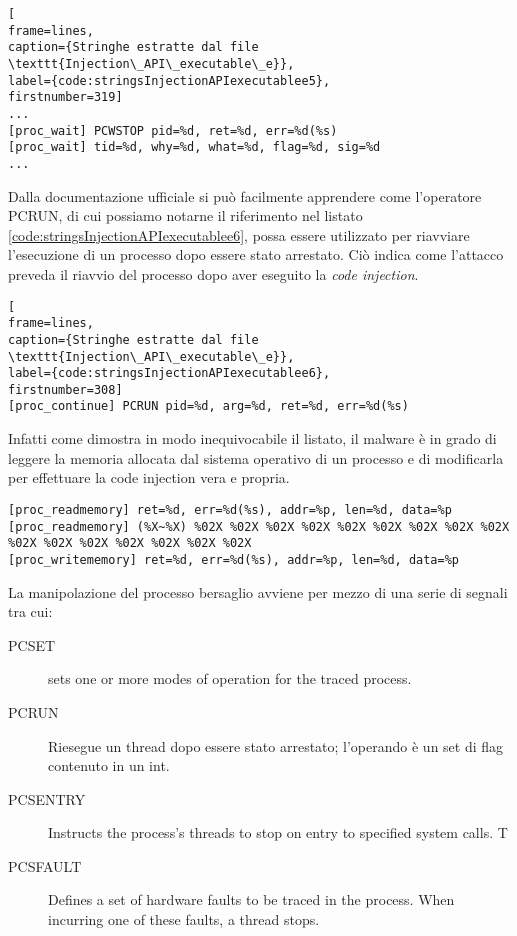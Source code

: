 \documentclass[10pt,a4paper, titlepage]{report}
\begin{document}

\begin{lstlisting}[
frame=lines, 
caption={Stringhe estratte dal file \texttt{Injection\_API\_executable\_e}}, 
label={code:stringsInjectionAPIexecutablee5},
firstnumber=319]
...
[proc_wait] PCWSTOP pid=%d, ret=%d, err=%d(%s)
[proc_wait] tid=%d, why=%d, what=%d, flag=%d, sig=%d
...
\end{lstlisting}

Dalla documentazione ufficiale si può facilmente apprendere come l'operatore PCRUN, di cui possiamo notarne il riferimento nel  listato \ref{code:stringsInjectionAPIexecutablee6}, possa essere utilizzato per riavviare l'esecuzione di un processo dopo essere stato arrestato. Ciò indica come l'attacco preveda il riavvio del processo dopo aver eseguito la \textit{code injection}.

\begin{lstlisting}[
frame=lines, 
caption={Stringhe estratte dal file \texttt{Injection\_API\_executable\_e}}, 
label={code:stringsInjectionAPIexecutablee6},
firstnumber=308]
[proc_continue] PCRUN pid=%d, arg=%d, ret=%d, err=%d(%s)
\end{lstlisting}

Infatti come dimostra in modo inequivocabile il listato, il malware è in grado di leggere la memoria allocata dal sistema operativo di un processo e di modificarla per effettuare la code injection vera e propria.

\begin{lstlisting}
[proc_readmemory] ret=%d, err=%d(%s), addr=%p, len=%d, data=%p
[proc_readmemory] (%X~%X) %02X %02X %02X %02X %02X %02X %02X %02X %02X %02X %02X %02X %02X %02X %02X %02X
[proc_writememory] ret=%d, err=%d(%s), addr=%p, len=%d, data=%p
\end{lstlisting}

La manipolazione del processo bersaglio avviene per mezzo di una serie di segnali tra cui:


\begin{description}

\item[PCSET] sets one or more modes of operation for the traced process. 
\item[PCRUN] Riesegue un thread dopo essere stato arrestato; l'operando è un set di flag contenuto in un int.
\item[PCSENTRY] Instructs the process's threads to stop on entry to specified system calls. T
\item[PCSFAULT]Defines a set of hardware faults to be traced in the process. When incurring one of these faults, a thread stops.

\end{description}
\end{document}
